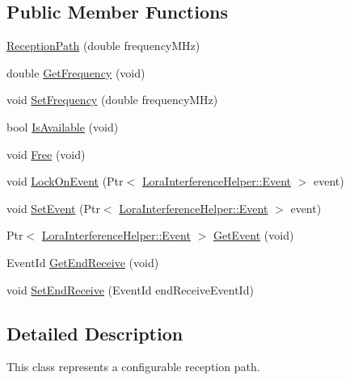 \subsection*{Public Member Functions}
\begin{DoxyCompactItemize}
\item 
\hyperlink{classns3_1_1lorawan_1_1GatewayLoraPhy_1_1ReceptionPath_a756ae63851063c8209e6eef149a6088c}{Reception\+Path} (double frequency\+M\+Hz)
\item 
double \hyperlink{classns3_1_1lorawan_1_1GatewayLoraPhy_1_1ReceptionPath_ae069eaa0189fa51ee4cb7aa3941e426e}{Get\+Frequency} (void)
\item 
void \hyperlink{classns3_1_1lorawan_1_1GatewayLoraPhy_1_1ReceptionPath_af9d0ef70517c2089f393c89a9270b490}{Set\+Frequency} (double frequency\+M\+Hz)
\item 
bool \hyperlink{classns3_1_1lorawan_1_1GatewayLoraPhy_1_1ReceptionPath_ad2422662f1100b92a4267de0976f9b0b}{Is\+Available} (void)
\item 
void \hyperlink{classns3_1_1lorawan_1_1GatewayLoraPhy_1_1ReceptionPath_aa9a5dc2f88ebbef2843cb855c6ec2551}{Free} (void)
\item 
void \hyperlink{classns3_1_1lorawan_1_1GatewayLoraPhy_1_1ReceptionPath_af914d04203919ae4ad11ee49f06fb98d}{Lock\+On\+Event} (Ptr$<$ \hyperlink{classns3_1_1lorawan_1_1LoraInterferenceHelper_1_1Event}{Lora\+Interference\+Helper\+::\+Event} $>$ event)
\item 
void \hyperlink{classns3_1_1lorawan_1_1GatewayLoraPhy_1_1ReceptionPath_a9191f5d01e50e1f26a8d98686db00c43}{Set\+Event} (Ptr$<$ \hyperlink{classns3_1_1lorawan_1_1LoraInterferenceHelper_1_1Event}{Lora\+Interference\+Helper\+::\+Event} $>$ event)
\item 
Ptr$<$ \hyperlink{classns3_1_1lorawan_1_1LoraInterferenceHelper_1_1Event}{Lora\+Interference\+Helper\+::\+Event} $>$ \hyperlink{classns3_1_1lorawan_1_1GatewayLoraPhy_1_1ReceptionPath_a5ba2eb1b0705b0d91e2702fdc3d56231}{Get\+Event} (void)
\item 
Event\+Id \hyperlink{classns3_1_1lorawan_1_1GatewayLoraPhy_1_1ReceptionPath_a253268855de9a388a960e910d3a20fbc}{Get\+End\+Receive} (void)
\item 
void \hyperlink{classns3_1_1lorawan_1_1GatewayLoraPhy_1_1ReceptionPath_aed06f1f101a3f12d539c04aad94bc381}{Set\+End\+Receive} (Event\+Id end\+Receive\+Event\+Id)
\end{DoxyCompactItemize}


\subsection{Detailed Description}
This class represents a configurable reception path.

